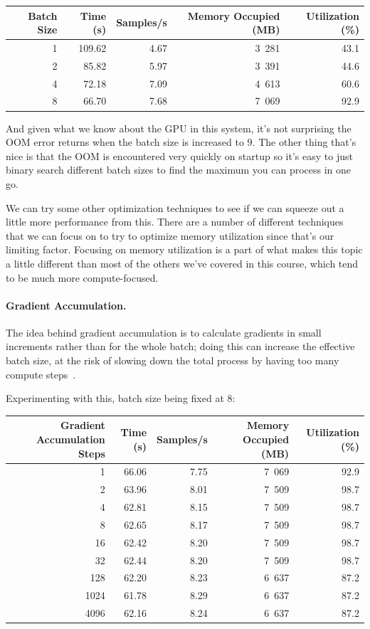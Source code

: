 \begin{center}
\begin{tabular}{r|r|r|r|r}
\textbf{Batch Size} & \textbf{Time (s)} & \textbf{Samples/s} & \textbf{Memory Occupied (MB)} & \textbf{Utilization (\%)} \\ \hline
1 & 109.62 & 4.67 & 3~281 & 43.1 \\
2 & 85.82 & 5.97 & 3~391 & 44.6 \\
4 & 72.18 & 7.09 & 4~613 & 60.6 \\
8 & 66.70 & 7.68 & 7~069 & 92.9 \\
\end{tabular}
\end{center}

And given what we know about the GPU in this system, it's not surprising the OOM error returns when the batch size is increased to 9. The other thing that's nice is that the OOM is encountered very quickly on startup so it's easy to just binary search different batch sizes to find the maximum you can process in one go. 

We can try some other optimization techniques to see if we can squeeze out a little more performance from this. There are a number of different techniques that we can focus on to try to optimize memory utilization since that's our limiting factor. Focusing on memory utilization is a part of what makes this topic a little different than most of the others we've covered in this course, which tend to be much more compute-focused. 

\paragraph{Gradient Accumulation.} The idea behind gradient accumulation is to calculate gradients in small increments rather than for the whole batch; doing this can increase the effective batch size, at the risk of slowing down the total process by having too many compute steps~\cite{hf}.

Experimenting with this, batch size being fixed at 8:

\begin{center}
\begin{tabular}{r|r|r|r|r}
\textbf{Gradient Accumulation Steps} & \textbf{Time (s)} & \textbf{Samples/s} & \textbf{Memory Occupied (MB)} & \textbf{Utilization (\%)} \\ \hline
1 & 66.06 & 7.75 & 7~069 & 92.9 \\
2 & 63.96 & 8.01 & 7~509 & 98.7 \\
4 & 62.81 & 8.15 & 7~509 & 98.7 \\
8 & 62.65 & 8.17 & 7~509 & 98.7 \\
16 & 62.42 & 8.20 & 7~509 & 98.7 \\
32 & 62.44 & 8.20 & 7~509 & 98.7\\
128 & 62.20 & 8.23 & 6~637 & 87.2\\
1024 & 61.78 & 8.29 & 6~637 & 87.2 \\
4096 & 62.16 & 8.24 & 6~637 & 87.2
\end{tabular}
\end{center}

